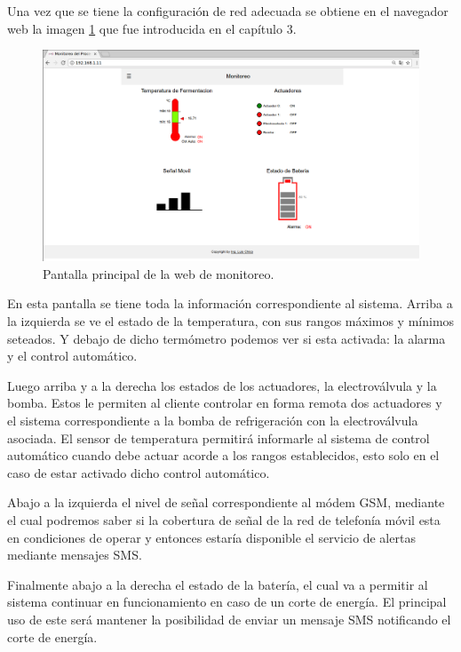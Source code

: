 Una vez que se tiene la configuración de red adecuada se obtiene en el navegador web la imagen \ref{fig:web_monitoreo} que fue introducida en el capítulo 3.

\begin{figure}[h]
  \centering
  \includegraphics[scale=.25]{./Figures/web_monitoreo.png}
  \caption{Pantalla principal de la web de monitoreo.}
  \label{fig:web_monitoreo}
\end{figure}

En esta pantalla se tiene toda la información correspondiente al sistema. 
Arriba a la izquierda se ve el estado de la temperatura, con sus rangos máximos y mínimos seteados. Y debajo de dicho termómetro podemos ver si esta activada: la alarma y el control automático.

Luego arriba y a la derecha los estados de los actuadores, la electroválvula y la bomba. Estos le permiten al cliente controlar en forma remota dos actuadores y el sistema correspondiente a la bomba de refrigeración con la electroválvula asociada. El sensor de temperatura permitirá informarle al sistema de control automático cuando debe actuar acorde a los rangos establecidos, esto solo en el caso de estar activado dicho control automático. 

Abajo a la izquierda el nivel de señal correspondiente al módem GSM, mediante el cual podremos saber si la cobertura de señal de la red de telefonía móvil esta en condiciones de operar y entonces estaría disponible el servicio de alertas mediante mensajes SMS. 

Finalmente abajo a la derecha el estado de la batería, el cual va a permitir al sistema continuar en funcionamiento en caso de un corte de energía. El principal uso de este será mantener la posibilidad de enviar un mensaje SMS notificando el corte de energía.


